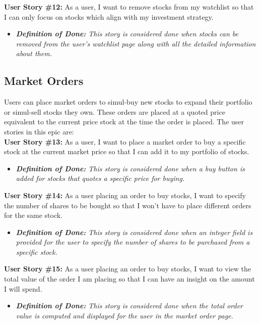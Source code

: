 \noindent \textbf{User Story \#12:} As a user, I want to remove stocks from my watchlist so that I can only focus on stocks which align with my investment strategy.
\begin{itemize}
	\item \textit{\textbf{Definition of Done:} This story is considered done when stocks can be removed from the user’s watchlist page along with all the detailed information about them.} 
\end{itemize}


\subsection{Market Orders}
    \label{subsec:market_orders}

Users can place market orders to simul-buy new stocks to expand their portfolio or simul-sell stocks they own. These orders are placed at a quoted price equivalent to the current price stock at the time the order is placed. The user stories in this epic are:\\

\noindent \textbf{User Story \#13:} As a user, I want to place a market order to buy a specific stock at the current market price so that I can add it to my portfolio of stocks.
\begin{itemize}
	\item \textit{\textbf{ Definition of Done:} This story is considered done when a buy button is added for stocks that quotes a specific price for buying.} 
\end{itemize}

\noindent \textbf{User Story \#14:} As a user placing an order to buy stocks, I want to specify the number of shares to be bought so that I won’t have to place different orders for the same stock.
\begin{itemize}
	\item \textit{\textbf{Definition of Done:} This story is considered done when an integer field is provided for the user to specify the number of shares to be purchased from a specific stock.} 
\end{itemize}

\noindent \textbf{User Story \#15:} As a user placing an order to buy stocks, I want to view the total value of the order I am placing so that I can have an insight on the amount I will spend.
\begin{itemize}
	\item \textit{\textbf{Definition of Done:} This story is considered done when the total order value is computed and displayed for the user in the market order page.} 
\end{itemize}

